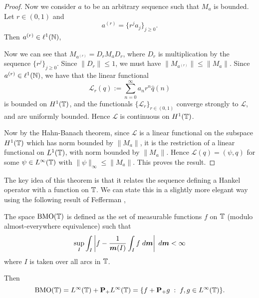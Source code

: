 \begin{proof}
    Now we consider $a$ to be an arbitrary sequence such that $M_a$ is bounded. Let $r \in (0,1)$
    and
    \begin{equation*}
        a^{(r)} = \{r^ja_j\}_{j\geq 0}.
    \end{equation*}
    Then $a^{(r)} \in \ell^1(\mathbb{N})$,
    
    Now we can see that $M_{a^{(r)}} = D_r M_a D_r$, where $D_r$
    is multiplication by the sequence $\{r^j\}_{j\geq 0}$. Since $\|D_r\| \leq 1$, 
    we must have $\|M_{a^{(r)}}\| \leq \|M_a\|$. Since $a^{(r)} \in \ell^1(\mathbb{N})$, 
    we have that the linear functional
    \begin{equation*}
        \mathcal{L}_r(q) := \sum_{n=0}^\infty a_nr^n \hat{q}(n)
    \end{equation*}
    is bounded on $H^1(\mathbb{T})$, and the functionals $\{\mathcal{L}_r\}_{r \in (0,1)}$
    converge strongly to $\mathcal{L}$, and are uniformly bounded. Hence $\mathcal{L}$
    is continuous on $H^1(\mathbb{T})$. 
    
    Now by the Hahn-Banach theorem, since $\mathcal{L}$ is a linear
    functional on the subspace $H^1(\mathbb{T})$ which has norm bounded
    by $\|M_a\|$, it is the restriction
    of a linear functional on $L^1(\mathbb{T})$, with norm bounded by $\|M_a\|$.
    Hence $\mathcal{L}(q) = (\psi,q)$ for some $\psi \in L^\infty(\mathbb{T})$
    with $\|\psi\|_\infty \leq \|M_a\|$. This proves the result.    
\end{proof}

The key idea of this theorem is that it relates the sequence defining
a Hankel operator with a function on $\mathbb{T}$. We can state this in a slightly more
elegant way using the following result of Fefferman \cite{fefferman},
\begin{proposition}
    The space $\operatorname{BMO}(\mathbb{T})$ is defined as the set of measurable
    functions $f$ on $\mathbb{T}$ (modulo almost-everywhere equivalence) such that
    \begin{equation*}
        \sup_I \int_I \left|f-\frac{1}{\boldsymbol{m}(I)}\int_I f\;d\boldsymbol{m}\right|\;d\boldsymbol{m} < \infty
    \end{equation*}
    where $I$ is taken over all arcs in $\mathbb{T}$.
    
    Then 
    \begin{equation*}
        \operatorname{BMO}(\mathbb{T}) = L^\infty(\mathbb{T})+\mathbf{P}_+L^\infty(\mathbb{T}) = \{f+\mathbf{P}_+g\;:\;f,g \in L^\infty(\mathbb{T})\}.
    \end{equation*}
\end{proposition}

